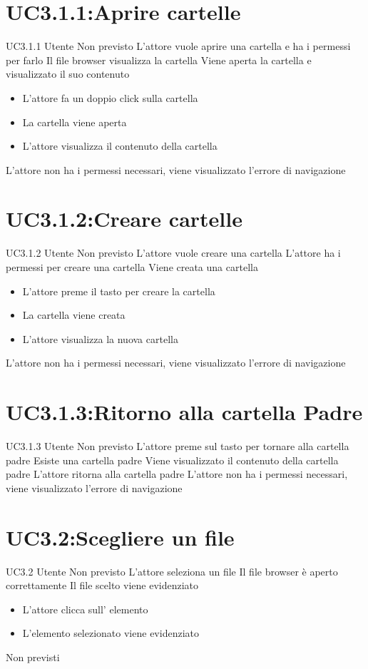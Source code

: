 \documentclass[../AnalisideiRequisiti.tex]{subfiles}
\begin{document}
	\section{UC3.1.1:Aprire cartelle}
	\UserCase
	{UC3.1.1}
	{Utente}
	{Non previsto}
	{L'attore vuole aprire una cartella e ha i permessi per farlo}
	{Il file browser visualizza la cartella}
	{Viene aperta la cartella e visualizzato il suo contenuto}
	{
		\begin{itemize}
			\item{} L'attore fa un doppio click sulla cartella
			\item{} La cartella viene aperta
			\item{} L'attore visualizza il contenuto della cartella
		\end{itemize}
	}
	{L'attore non ha i permessi necessari, viene visualizzato l'errore di navigazione }
	\section{UC3.1.2:Creare cartelle}
	\UserCase
	{UC3.1.2}
	{Utente}
	{Non previsto}
	{L'attore vuole creare una cartella}
	{L'attore ha i permessi per creare una cartella}
	{Viene creata una cartella}
	{
		\begin{itemize}
		\item{} L'attore preme il tasto per creare la cartella
		\item{} La cartella viene creata
		\item{} L'attore visualizza la nuova cartella
		\end{itemize}
	}
	{L'attore non ha i permessi necessari, viene visualizzato l'errore di navigazione }

	\section{UC3.1.3:Ritorno alla cartella Padre}
\UserCase
{UC3.1.3}
{Utente}
{Non previsto}
{L'attore preme sul tasto per tornare alla cartella padre}
{Esiste una cartella padre}
{Viene visualizzato il contenuto della cartella padre}
{L'attore ritorna alla cartella padre}
{L'attore non ha i permessi necessari, viene visualizzato l'errore di navigazione }
	\section{UC3.2:Scegliere un file}
\UserCase
{UC3.2}
{Utente}
{Non previsto}
{L'attore seleziona un file}
{Il file browser è aperto correttamente}
{Il file scelto viene evidenziato}
{
	\begin{itemize}
		\item{} L'attore clicca sull' elemento
		\item{} L'elemento selezionato viene evidenziato
	\end{itemize}
}
{Non previsti}
\end{document}
